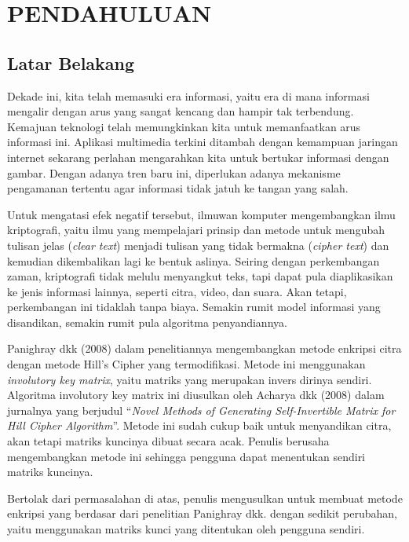 \chapter{PENDAHULUAN}

\vspace{6pt}

\section{Latar Belakang} \label{sec:latar_belakang}
Dekade ini, kita telah memasuki era informasi, yaitu era di mana informasi mengalir dengan arus yang sangat kencang dan hampir tak terbendung. Kemajuan teknologi telah memungkinkan kita untuk memanfaatkan arus informasi ini. Aplikasi multimedia terkini ditambah dengan kemampuan jaringan internet sekarang perlahan mengarahkan kita untuk bertukar informasi dengan gambar. Dengan adanya tren baru ini, diperlukan adanya mekanisme pengamanan tertentu agar informasi tidak jatuh ke tangan yang salah.

Untuk mengatasi efek negatif tersebut, ilmuwan komputer mengembangkan ilmu kriptografi, yaitu ilmu yang mempelajari prinsip dan metode untuk mengubah tulisan jelas (\textit{clear text}) menjadi tulisan yang tidak bermakna (\textit{cipher text}) dan kemudian dikembalikan lagi ke bentuk aslinya. Seiring dengan perkembangan zaman, kriptografi tidak melulu menyangkut teks, tapi dapat pula diaplikasikan ke jenis informasi lainnya, seperti citra, video, dan suara. Akan tetapi, perkembangan ini tidaklah tanpa biaya. Semakin rumit model informasi yang disandikan, semakin rumit pula algoritma penyandiannya.

Panighray dkk (2008) dalam penelitiannya mengembangkan metode enkripsi citra dengan metode Hill's Cipher yang termodifikasi. Metode ini menggunakan \emph{involutory key matrix}, yaitu matriks yang merupakan invers dirinya sendiri. Algoritma involutory key matrix ini diusulkan oleh Acharya dkk (2008) dalam jurnalnya yang berjudul “\textit{Novel Methods of Generating Self-Invertible Matrix for Hill Cipher Algorithm}”. Metode ini sudah cukup baik untuk menyandikan citra, akan tetapi matriks kuncinya dibuat secara acak. Penulis berusaha mengembangkan metode ini sehingga pengguna dapat menentukan sendiri matriks kuncinya.

Bertolak dari permasalahan di atas, penulis mengusulkan untuk membuat metode enkripsi yang berdasar dari penelitian Panighray dkk. dengan sedikit perubahan, yaitu menggunakan matriks kunci yang ditentukan oleh pengguna sendiri.

